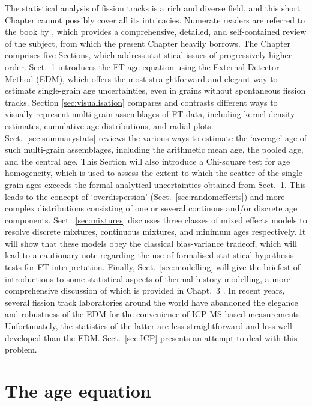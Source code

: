 \documentclass{article}
\begin{document}
The statistical analysis of fission tracks is a rich and diverse
field, and this short Chapter cannot possibly cover all its
intricacies. Numerate readers are referred to the book by
\citet{galbraith2005}, which provides a comprehensive, detailed, and
self-contained review of the subject, from which the present Chapter
heavily borrows.  The Chapter comprises five Sections, which address
statistical issues of progressively higher order. Sect.~\ref{sec:EDM}
introduces the FT age equation using the External Detector Method
(EDM), which offers the most straightforward and elegant way to
estimate single-grain age uncertainties, even in grains without
spontaneous fission tracks.  Section \ref{sec:visualisation} compares
and contrasts different ways to visually represent multi-grain
assemblages of FT data, including kernel density estimates, cumulative
age distributions, and radial plots.  Sect.~\ref{sec:summarystats}
reviews the various ways to estimate the `average' age of such
multi-grain assemblages, including the arithmetic mean age, the pooled
age, and the central age. This Section will also introduce a
Chi-square test for age homogeneity, which is used to assess the
extent to which the scatter of the single-grain ages exceeds the
formal analytical uncertainties obtained from Sect.~\ref{sec:EDM}.
This leads to the concept of `overdispersion'
(Sect.~\ref{sec:randomeffects}) and more complex distributions
consisting of one or several continous and/or discrete age components.
Sect.~\ref{sec:mixtures} discusses three classes of mixed effects
models to resolve discrete mixtures, continuous mixtures, and minimum
ages respectively. It will show that these models obey the classical
bias-variance tradeoff, which will lead to a cautionary note regarding
the use of formalised statistical hypothesis tests for FT
interpretation. Finally, Sect.~\ref{sec:modelling} will give the
briefest of introductions to some statistical aspects of thermal
history modelling, a more comprehensive discussion of which is
provided in Chapt.~3 \citep{ketcham2018}.  In recent years, several
fission track laboratories around the world have abandoned the
elegance and robustness of the EDM for the convenience of ICP-MS-based
measurements. Unfortunately, the statistics of the latter are less
straightforward and less well developed than the EDM.
Sect.~\ref{sec:ICP} presents an attempt to deal with this problem.

\section{The age equation}
\label{sec:EDM}
\end{document}
